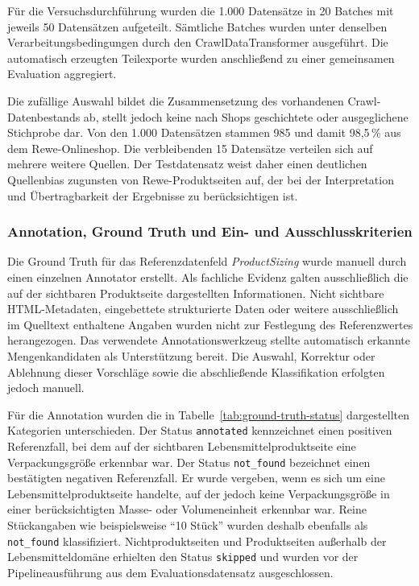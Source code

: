 Für die Versuchsdurchführung wurden die 1.000 Datensätze in 20 Batches mit jeweils 50 Datensätzen aufgeteilt. Sämtliche Batches wurden unter denselben Verarbeitungsbedingungen durch den CrawlDataTransformer ausgeführt. Die automatisch erzeugten Teilexporte wurden anschließend zu einer gemeinsamen Evaluation aggregiert.

Die zufällige Auswahl bildet die Zusammensetzung des vorhandenen Crawl-Datenbestands ab, stellt jedoch keine nach Shops geschichtete oder ausgeglichene Stichprobe dar. Von den 1.000 Datensätzen stammen 985 und damit 98,5\,\% aus dem Rewe-Onlineshop. Die verbleibenden 15 Datensätze verteilen sich auf mehrere weitere Quellen. Der Testdatensatz weist daher einen deutlichen Quellenbias zugunsten von Rewe-Produktseiten auf, der bei der Interpretation und Übertragbarkeit der Ergebnisse zu berücksichtigen ist.

\subsubsection{Annotation, Ground Truth und Ein- und Ausschlusskriterien}

Die Ground Truth für das Referenzdatenfeld \textit{ProductSizing} wurde manuell durch einen einzelnen Annotator erstellt. Als fachliche Evidenz galten ausschließlich die auf der sichtbaren Produktseite dargestellten Informationen. Nicht sichtbare HTML-Metadaten, eingebettete strukturierte Daten oder weitere ausschließlich im Quelltext enthaltene Angaben wurden nicht zur Festlegung des Referenzwertes herangezogen. Das verwendete Annotationswerkzeug stellte automatisch erkannte Mengenkandidaten als Unterstützung bereit. Die Auswahl, Korrektur oder Ablehnung dieser Vorschläge sowie die abschließende Klassifikation erfolgten jedoch manuell.

Für die Annotation wurden die in Tabelle~\ref{tab:ground-truth-status} dargestellten Kategorien unterschieden. Der Status \texttt{annotated} kennzeichnet einen positiven Referenzfall, bei dem auf der sichtbaren Lebensmittelproduktseite eine Verpackungsgröße erkennbar war. Der Status \texttt{not\_found} bezeichnet einen bestätigten negativen Referenzfall. Er wurde vergeben, wenn es sich um eine Lebensmittelproduktseite handelte, auf der jedoch keine Verpackungsgröße in einer berücksichtigten Masse- oder Volumeneinheit erkennbar war. Reine Stückangaben wie beispielsweise \enquote{10 Stück} wurden deshalb ebenfalls als \texttt{not\_found} klassifiziert. Nichtproduktseiten und Produktseiten außerhalb der Lebensmitteldomäne erhielten den Status \texttt{skipped} und wurden vor der Pipelineausführung aus dem Evaluationsdatensatz ausgeschlossen.

